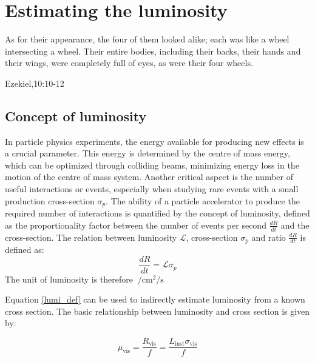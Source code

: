\chapter{Estimating the luminosity}

\epigraph{As for their appearance, the four of them looked alike; each was like a wheel intersecting a wheel. Their entire bodies, including their backs, their hands and their wings, were completely full of eyes, as were their four wheels.}{Ezekiel,10:10-12}
\section{Concept of luminosity}
In particle physics experiments, the energy available for producing new effects is a crucial parameter. This energy is determined by the centre of mass energy, which can be optimized through colliding beams, minimizing energy loss in the motion of the centre of mass system. Another critical aspect is the number of useful interactions or events, especially when studying rare events with a small production cross-section $\sigma_p$. The ability of a particle accelerator to produce the required number of interactions is quantified by the concept of luminosity, defined as the proportionality factor between the number of events per second $\tfrac{dR}{dt}$ and the cross-section. The relation between luminosity $\mathcal{L}$, cross-section $\sigma_p$ and ratio $\tfrac{dR}{dt}$ is defined as:
\begin{equation}
    \frac{dR}{dt} = \mathcal{L}{\sigma_p}\label{lumi_def}
\end{equation}
The unit of luminosity is therefore $\SI{}{\per\centi\meter\squared\per\second}$

Equation \ref{lumi_def} can be used to indirectly estimate luminosity from a known cross section. The basic relationship between luminosity and cross section is given by:

\begin{equation}
\mu_{\text{vis}} = \frac{R_{\text{vis}}}{f} = \frac{L_{\text{inst}} \sigma_{\text{vis}}}{f}\label{mu_def}
\end{equation}

